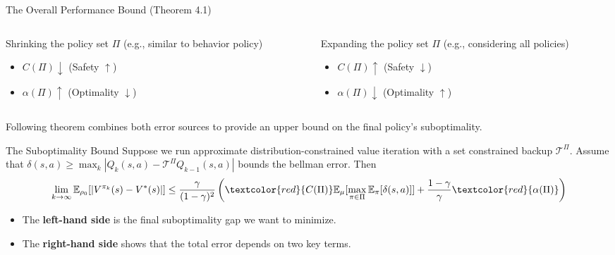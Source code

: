 \documentclass[11pt]{beamer}
\newcommand{\mbb}[1]{\mathbb{#1}}
\newcommand{\mc}[1]{\mathcal{#1}}
\newcommand{\tb}[1]{\textbf{#1}}
\begin{document}
\begin{frame}{The Overall Performance Bound (Theorem 4.1)}
    \begin{columns}[T]
        \begin{column}{.5\textwidth}
            \begin{block}{Shrinking the policy set $\Pi$}
                (e.g., similar to behavior policy)
                \begin{itemize}
                    \item $C(\Pi) \downarrow$ (Safety $\uparrow$)
                    \item $\alpha(\Pi) \uparrow$ (Optimality $\downarrow$)
                \end{itemize}
            \end{block}
        \end{column}
        \begin{column}{.5\textwidth}
            \begin{block}{Expanding the policy set $\Pi$}
                (e.g., considering all policies)
                \begin{itemize}
                    \item $C(\Pi) \uparrow$ (Safety $\downarrow$)
                    \item $\alpha(\Pi) \downarrow$ (Optimality $\uparrow$)
                \end{itemize}
            \end{block}
        \end{column}
    \end{columns}

    \vspace{0.5cm}
    Following theorem combines both error sources to provide an upper bound on the final policy's suboptimality.

    \begin{block}{The Suboptimality Bound}
        Suppose we run approximate distribution-constrained value iteration with a set constrained backup $\mc{T}^\Pi$.
        Assume that $\delta(s,a) \geq \max_k |Q_k(s,a) - \mc{T}^\Pi Q_{k-1} (s,a)|$ bounds the bellman error. Then
        \[
        \lim_{k \to \infty} \mbb{E}_{\rho_0}[|V^{\pi_k}(s) - V^*(s)|] \le \frac{\gamma}{(1-\gamma)^2} \left( \textcolor{red}{C(\Pi) }\mbb{E}_{\mu} [\max_{\pi \in \Pi} \mbb{E}_{\pi}[\delta(s,a)]] + \frac{1-\gamma}{\gamma} \textcolor{red}{\alpha(\Pi)} \right)
        \]
    \end{block}
    
    \begin{itemize}
        \item The \tb{left-hand side} is the final suboptimality gap we want to minimize.
        \item The \tb{right-hand side} shows that the total error depends on two key terms.
    \end{itemize}



\end{frame}
\end{document}
